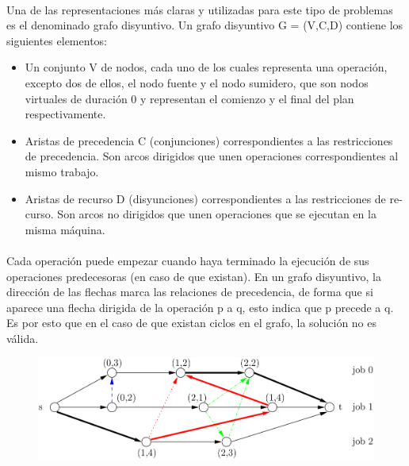 \documentclass[11pt, a4paper,spanish]{article}
\begin{document}
				\paragraph{}
				Una de las representaciones más claras y utilizadas para este tipo de problemas es el denominado grafo disyuntivo. Un grafo disyuntivo G = (V,C,D) contiene los siguientes elementos:
	
				\begin{itemize}
				
					\item Un conjunto V de nodos, cada uno de los cuales representa una operación, excepto dos de ellos, el nodo fuente y el nodo sumidero, que son nodos virtuales de duración 0 y representan el comienzo y el final del plan respectivamente.
					
					\item Aristas de precedencia C (conjunciones) correspondientes a las restricciones de precedencia. Son arcos dirigidos que unen operaciones correspondientes al mismo trabajo.
					
					\item Aristas de recurso D (disyunciones) correspondientes a las restricciones de re- curso. Son arcos no dirigidos que unen operaciones que se ejecutan en la misma máquina.
					
				\end{itemize}
				
				\paragraph{}
				Cada operación puede empezar cuando haya terminado la ejecución de sus operaciones predecesoras (en caso de que existan). En un grafo disyuntivo, la dirección de las flechas marca las relaciones de precedencia, de forma que si aparece una flecha dirigida de la operación p a q, esto indica que p precede a q. Es por esto que en el caso de que existan ciclos en el grafo, la solución no es válida.
				
				\begin{figure}[H]
						\centering
						\includegraphics[width=120mm]{res/disjunctive.png}
				\end{figure}
				
\end{document}
